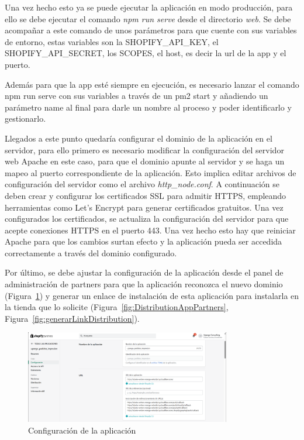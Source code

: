\documentclass[12pt]{article}
\begin{document}
Una vez hecho esto ya se puede ejecutar la aplicación en modo producción, para ello se debe ejecutar el comando \textit{npm run serve} desde el directorio \textit{web}. Se debe acompañar
a este comando de unos parámetros para que cuente con sus variables de entorno, estas variables son la SHOPIFY\_API\_KEY, el SHOPIFY\_API\_SECRET, los SCOPES,  el host, es decir la url de la app y el puerto.

Además para que la app esté siempre en ejecución, es necesario lanzar el comando npm run serve con sus variables a través de un pm2 start y añadiendo un parámetro name al final para
darle un nombre al proceso y poder identificarlo y gestionarlo. 

Llegados a este punto quedaría configurar el dominio de la aplicación en el servidor, para ello primero es necesario modificar la configuración del servidor web Apache en este caso, para que 
el dominio apunte al servidor y se haga un mapeo al puerto correspondiente de la aplicación. Esto implica editar archivos de configuración del servidor como el archivo \textit{http\_node.conf}. 
A continuación se deben crear y configurar los certificados SSL para admitir HTTPS, empleando herramientas como Let's Encrypt para generar certificados gratuitos. Una vez configurados los
certificados, se actualiza la configuración del servidor para que acepte conexiones HTTPS en el puerto 443. Una vez hecho esto hay que reiniciar Apache para que los cambios surtan
efecto y la aplicación pueda ser accedida correctamente a través del dominio configurado.

Por último, se debe ajustar la configuración de la aplicación desde el panel de administración de partners para que la aplicación reconozca el nuevo dominio (Figura~\ref{fig:ConfiguracionAppPartners}) y generar un enlace de instalación de esta aplicación
para instalarla en la tienda que lo solicite (Figura~\ref{fig:DistributionAppPartners}, Figura~\ref{fig:generarLinkDistribution}).

\begin{figure}[ht]
    \centering
    \includegraphics[width=0.8\textwidth]{imagenes/panelPartnersDistribution.png}
    \caption{\label{fig:ConfiguracionAppPartners}Configuración de la aplicación}
    \vspace{\fill}
\end{figure}
\end{document}
